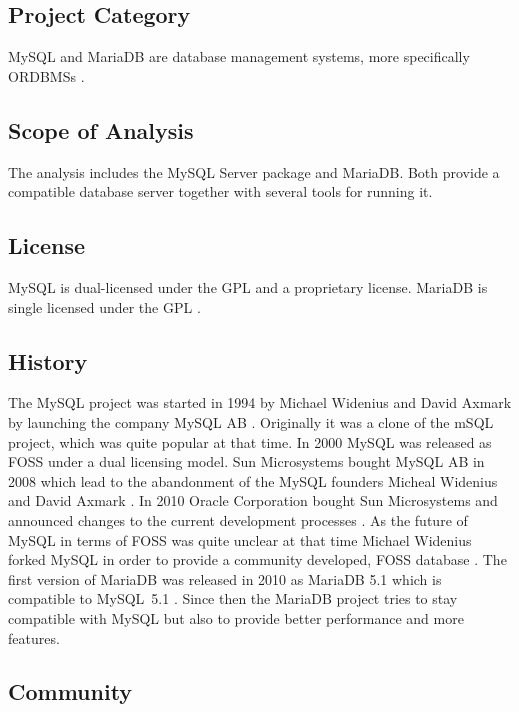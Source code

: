 \subsection{Project Category}

MySQL and MariaDB are database management systems, more specifically
\acp{ORDBMS} \cite{MySQLAbout}.

\subsection{Scope of Analysis}

The analysis includes the MySQL Server package and MariaDB. Both provide a
compatible database server together with several tools for running it.

\subsection{License}

MySQL is dual-licensed under the \ac{GPL} and a proprietary license. MariaDB is
single licensed under the \ac{GPL} \cite{MySQLLicense}.

\subsection{History}

The MySQL project was started in 1994 by Michael Widenius and David Axmark by
launching the company MySQL AB \cite{MySQLHistory}. Originally it was a clone
of the mSQL project, which was quite popular at that time. In 2000 MySQL was
released as \ac{FOSS} under a dual licensing model. Sun Microsystems bought
MySQL AB in 2008 which lead to the abandonment of the MySQL founders Micheal
Widenius and David Axmark \cite{MySQLSun}. In 2010 Oracle Corporation bought
Sun Microsystems and announced changes to the current development processes
\cite{MySQLOracle}. As the future of MySQL in terms of \ac{FOSS} was quite
unclear at that time Michael Widenius forked MySQL in order to provide a
community developed, \ac{FOSS} database \cite{MySQLBehind}. The first version
of MariaDB was released in 2010 as MariaDB 5.1 which is compatible to MySQL~5.1
\cite{MySQLMariaDB5.1}. Since then the MariaDB project tries to stay compatible
with MySQL but also to provide better performance and more features.

\subsection{Community}

